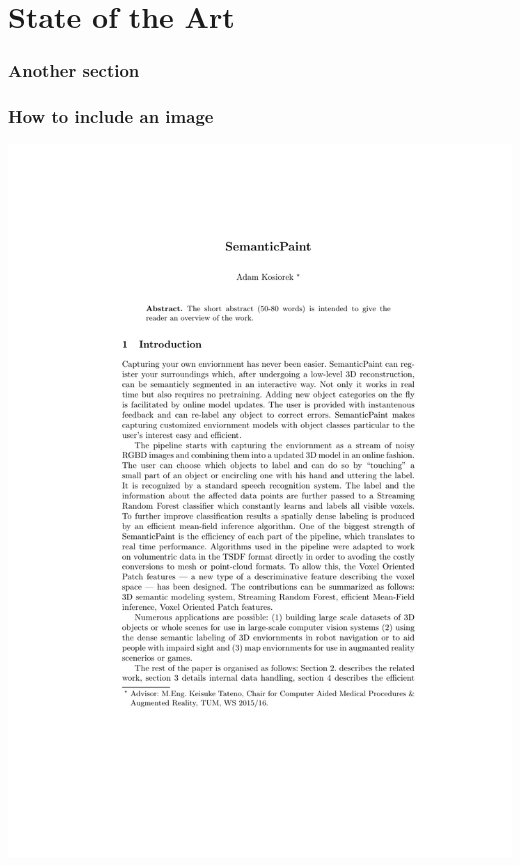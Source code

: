 \documentclass[mathserif]{beamer}
\begin{document}
\section{State of the Art}

\begin{frame}
\frametitle{Another section}
\end{frame}

\begin{frame}
\frametitle{How to include an image}
\begin{center}
\includegraphics[width=0.3\linewidth]{template}
\end{center}
\end{frame}


\end{document}
